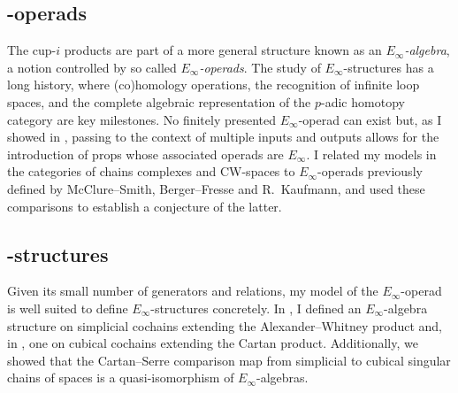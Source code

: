 %

\subsection{\pdfEinfty-operads}

The cup-$i$ products are part of a more general structure known as an \textit{$E_\infty$-algebra}, a notion controlled by so called \textit{$E_\infty$-operads}.
The study of $E_\infty$-structures has a long history, where (co)homology operations, the recognition of infinite loop spaces, and the complete algebraic representation of the $p$-adic homotopy category are key milestones.
No finitely presented $E_\infty$-operad can exist but, as I showed in \cite{medina2020prop1,medina2021prop2}, passing to the context of multiple inputs and outputs allows for the introduction of props whose associated operads are $E_\infty$.
I related my models in the categories of chains complexes and CW-spaces to $E_\infty$-operads previously defined by McClure--Smith, Berger--Fresse and R.~Kaufmann, and used these comparisons to establish a conjecture of the latter.

\subsection{\pdfEinfty-structures} \label{ss:e-infty structures}

Given its small number of generators and relations, my model of the $E_\infty$-operad is well suited to define $E_{\infty}$-structures concretely.
In \cite{medina2020prop1}, I defined an $E_\infty$-algebra structure on simplicial cochains extending the Alexander--Whitney product and, in \cite{medina2022cube_einfty}, one on cubical cochains extending the Cartan product.
Additionally, we showed that the Cartan--Serre comparison map from simplicial to cubical singular chains of spaces is a quasi-isomorphism of $E_\infty$-algebras.

